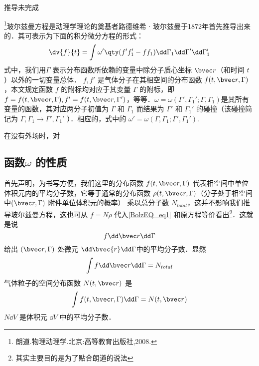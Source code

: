 
\begin{issues}

\issueDraft
推导未完成
\end{issues}

\footnote{朗道.物理动理学.北京:高等教育出版社,2008.}玻尔兹曼方程是动理学理论的奠基者路德维希 $\cdot$ 玻尔兹曼于1872年首先推导出来的．其可表示为下面的积分微分方程的形式：
\begin{equation}\label{BolzEQ_eq1}
\dv{f}{t}=\int\omega'\qty(f'f_1'-ff_1)\dd\Gamma_1\dd\Gamma'\dd\Gamma_1'
\end{equation}
式中，我们用$\Gamma$ 表示分布函数所依赖的变量中除分子质心坐标 $\bvec r$（和时间 $t$ ）以外的一切变量总体． $f,f'$ 是气体分子在其相空间的分布函数 $f(t,\bvec r,\Gamma)$，本文规定函数 $f$ 的附标均对应于其变量 $\Gamma$ 的附标，即$f=f(t,\bvec r,\Gamma),f'=f(t,\bvec r,\Gamma')$，等等．$\omega=\omega(\Gamma',\Gamma_1';\Gamma,\Gamma_1)$是其所有变量的函数，其对应两分子初值为 $\Gamma$ 和 $\Gamma_1$ 而结果为 $\Gamma'$ 和 $\Gamma_1'$ 的碰撞（该碰撞简记为 $\Gamma,\Gamma_1\rightarrow\Gamma',\Gamma_1'$ ）．相应的，式中的 $\omega'=\omega(\Gamma,\Gamma_1;\Gamma',\Gamma_1')$.

在没有外场时，对
\subsection{函数$\omega$ 的性质}
首先声明，为书写方便，我们这里的分布函数 $f(t,\bvec r,\Gamma)$ 代表相空间中单位体积元内的平均分子数，它等于通常的分布函数 $\rho(t,\bvec r,\Gamma)$（分子处于相空间中$(\bvec r,\Gamma)$ 附件单位体积元的概率） 乘以总分子数 $N_{total}$，这并不影响我们推导玻尔兹曼方程，这也可从 $f=N\rho$ 代入\autoref{BolzEQ_eq1} 和原方程等价看出\footnote{其实主要目的是为了贴合朗道的说法}．这就是说
\begin{equation}
f\dd \bvec r\dd\Gamma
\end{equation}
给出 $(\bvec r,\Gamma)$ 处微元 $\dd\bvec{r}\dd\Gamma$中的平均分子数．显然
\begin{equation}
\int f\dd \bvec r\dd\Gamma=N_{total}
\end{equation}
气体粒子的空间分布函数 $N(t,\bvec r)$ 是
\begin{equation}
\int f(t,\bvec r,\Gamma)\dd \Gamma=N(t,\bvec r)
\end{equation}
 $N\dd V$ 是体积元 $\dd V$ 中的平均分子数．

